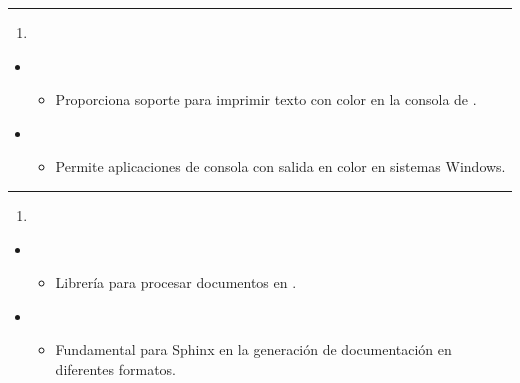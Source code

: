 \documentclass[a4paper,10pt,oneside,spanish,openany]{sphinxmanual}
\begin{document}
\bigskip\hrule\bigskip

\begin{enumerate}
%
\setcounter{enumi}{4}
\item {} 
\sphinxAtStartPar
{}

\end{enumerate}
\begin{itemize}
\item {} 
\sphinxAtStartPar
{}
\begin{itemize}
\item {} 
\sphinxAtStartPar
Proporciona soporte para imprimir texto con color en la consola de .

\end{itemize}

\item {} 
\sphinxAtStartPar
{}
\begin{itemize}
\item {} 
\sphinxAtStartPar
Permite aplicaciones de consola con salida en color en sistemas Windows.

\end{itemize}

\end{itemize}


\bigskip\hrule\bigskip

\begin{enumerate}
%
\setcounter{enumi}{5}
\item {} 
\sphinxAtStartPar
{}

\end{enumerate}
\begin{itemize}
\item {} 
\sphinxAtStartPar
{}
\begin{itemize}
\item {} 
\sphinxAtStartPar
Librería para procesar documentos en .

\end{itemize}

\item {} 
\sphinxAtStartPar
{}
\begin{itemize}
\item {} 
\sphinxAtStartPar
Fundamental para Sphinx en la generación de documentación en diferentes formatos.

\end{itemize}

\end{itemize}
\end{document}
